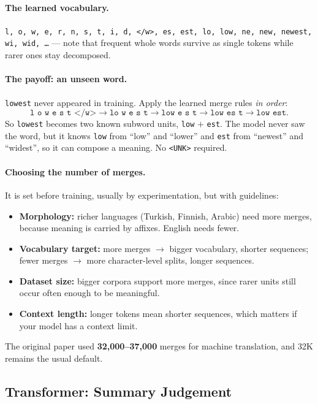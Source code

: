 \documentclass[11pt,a4paper]{article}
\begin{document}
\paragraph{The learned vocabulary.} \texttt{l, o, w, e, r, n, s, t, i, d, </w>, es, est, lo,
low, ne, new, newest, wi, wid, \ldots} --- note that frequent whole words survive as single
tokens while rarer ones stay decomposed.

\paragraph{The payoff: an unseen word.} \texttt{lowest} never appeared in training. Apply the
learned merge rules \emph{in order}:
\[
\texttt{l o w e s t </w>} \rightarrow \texttt{lo w e s t} \rightarrow \texttt{low e s t}
\rightarrow \texttt{low es t} \rightarrow \texttt{low est}.
\]
So \texttt{lowest} becomes two known subword units, \texttt{low} $+$ \texttt{est}. The model
never saw the word, but it knows \texttt{low} from ``low'' and ``lower'' and \texttt{est} from
``newest'' and ``widest'', so it can compose a meaning. No \texttt{<UNK>} required.

\paragraph{Choosing the number of merges.} It is set before training, usually by
experimentation, but with guidelines:
\begin{itemize}
\item \textbf{Morphology:} richer languages (Turkish, Finnish, Arabic) need more merges,
  because meaning is carried by affixes. English needs fewer.
\item \textbf{Vocabulary target:} more merges $\rightarrow$ bigger vocabulary, shorter
  sequences; fewer merges $\rightarrow$ more character-level splits, longer sequences.
\item \textbf{Dataset size:} bigger corpora support more merges, since rarer units still occur
  often enough to be meaningful.
\item \textbf{Context length:} longer tokens mean shorter sequences, which matters if your
  model has a context limit.
\end{itemize}
The original paper used \textbf{32{,}000--37{,}000} merges for machine translation, and 32K
remains the usual default.

\subsection{Transformer: Summary Judgement}
\end{document}
